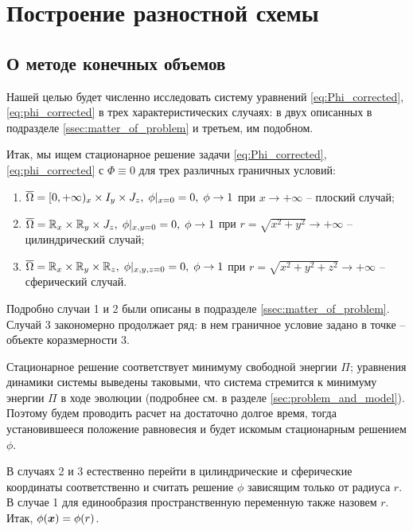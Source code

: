 
\section{Построение разностной схемы}

\subsection{О методе конечных объемов}

Нашей целью будет численно исследовать систему уравнений \eqref{eq:Phi_corrected}, \eqref{eq:phi_corrected} в трех характеристических случаях: в двух описанных в подразделе \ref{ssec:matter_of_problem} и третьем, им подобном.

Итак, мы ищем стационарное решение задачи \eqref{eq:Phi_corrected}, \eqref{eq:phi_corrected} с $\Phi \equiv 0$ для трех различных граничных условий:
\begin{enumerate}
	\item ${\overline{\Omega}} = [0, +\infty)_x \times I_y \times J_z, \; \phi|_{x = 0} = 0, \; \phi \to 1$ при $x \to +\infty$ -- плоский случай;
	\item ${\overline{\Omega}} = {\mathbb{R}}_x \times {\mathbb{R}}_y \times J_z, \; \phi|_{x, y = 0} = 0, \; \phi \to 1$ при $r = \sqrt{x^2 + y^2} \to +\infty$ -- цилиндрический случай;
	\item ${\overline{\Omega}} = {\mathbb{R}}_x \times {\mathbb{R}}_y \times {\mathbb{R}}_z, \; \phi|_{x, y, z = 0} = 0, \; \phi \to 1$ при $r = \sqrt{x^2 + y^2 + z^2} \to +\infty$ -- сферический случай.
\end{enumerate}
Подробно случаи 1 и 2 были описаны в подразделе \ref{ssec:matter_of_problem}. Случай 3 закономерно продолжает ряд: в нем граничное условие задано в точке -- объекте коразмерности 3.

Стационарное решение соответствует минимуму свободной энергии $\Pi$; \linebreak уравнения динамики системы выведены таковыми, что система стремится к минимуму энергии $\Pi$ в ходе эволюции (подробнее см. в разделе \ref{sec:problem_and_model}). Поэтому будем проводить расчет на достаточно долгое время, тогда установившееся положение равновесия и будет искомым стационарным решением $\phi$.

В случаях 2 и 3 естественно перейти в цилиндрические и сферические координаты соответственно и считать решение $\phi$ зависящим только от радиуса $r$. В случае 1 для единообразия пространственную переменную также назовем $r$. Итак, $\phi({\boldsymbol{x}}) = \phi(r)$.

